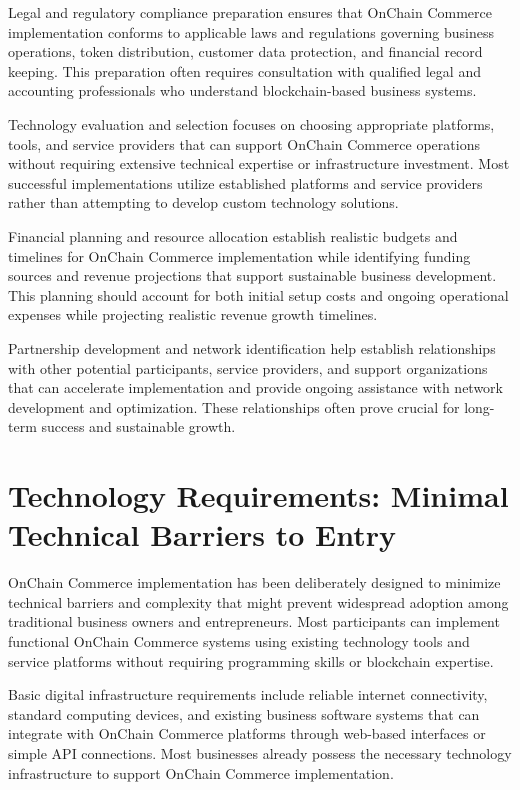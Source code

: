 \documentclass[
  Letterpaper,
]{scrbook}
\begin{document}
Legal and regulatory compliance preparation ensures that OnChain
Commerce implementation conforms to applicable laws and regulations
governing business operations, token distribution, customer data
protection, and financial record keeping. This preparation often
requires consultation with qualified legal and accounting professionals
who understand blockchain-based business systems.

Technology evaluation and selection focuses on choosing appropriate
platforms, tools, and service providers that can support OnChain
Commerce operations without requiring extensive technical expertise or
infrastructure investment. Most successful implementations utilize
established platforms and service providers rather than attempting to
develop custom technology solutions.

Financial planning and resource allocation establish realistic budgets
and timelines for OnChain Commerce implementation while identifying
funding sources and revenue projections that support sustainable
business development. This planning should account for both initial
setup costs and ongoing operational expenses while projecting realistic
revenue growth timelines.

Partnership development and network identification help establish
relationships with other potential participants, service providers, and
support organizations that can accelerate implementation and provide
ongoing assistance with network development and optimization. These
relationships often prove crucial for long-term success and sustainable
growth.

\section{Technology Requirements: Minimal Technical Barriers to
Entry}\label{technology-requirements-minimal-technical-barriers-to-entry}

OnChain Commerce implementation has been deliberately designed to
minimize technical barriers and complexity that might prevent widespread
adoption among traditional business owners and entrepreneurs. Most
participants can implement functional OnChain Commerce systems using
existing technology tools and service platforms without requiring
programming skills or blockchain expertise.

Basic digital infrastructure requirements include reliable internet
connectivity, standard computing devices, and existing business software
systems that can integrate with OnChain Commerce platforms through
web-based interfaces or simple API connections. Most businesses already
possess the necessary technology infrastructure to support OnChain
Commerce implementation.
\end{document}
